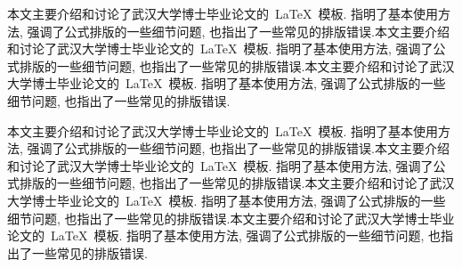\begin{cnabstract}
本文主要介绍和讨论了武汉大学博士毕业论文的~\LaTeX~模板.
指明了基本使用方法, 强调了公式排版的一些细节问题, 也指出了一些常见的排版错误.本文主要介绍和讨论了武汉大学博士毕业论文的~\LaTeX~模板.
指明了基本使用方法, 强调了公式排版的一些细节问题, 也指出了一些常见的排版错误.本文主要介绍和讨论了武汉大学博士毕业论文的~\LaTeX~模板.
指明了基本使用方法, 强调了公式排版的一些细节问题, 也指出了一些常见的排版错误.



本文主要介绍和讨论了武汉大学博士毕业论文的~\LaTeX~模板.
指明了基本使用方法, 强调了公式排版的一些细节问题, 也指出了一些常见的排版错误.本文主要介绍和讨论了武汉大学博士毕业论文的~\LaTeX~模板.
指明了基本使用方法, 强调了公式排版的一些细节问题, 也指出了一些常见的排版错误.本文主要介绍和讨论了武汉大学博士毕业论文的~\LaTeX~模板.
指明了基本使用方法, 强调了公式排版的一些细节问题, 也指出了一些常见的排版错误.本文主要介绍和讨论了武汉大学博士毕业论文的~\LaTeX~模板.
指明了基本使用方法, 强调了公式排版的一些细节问题, 也指出了一些常见的排版错误.






\end{cnabstract}
\vspace{1em}\par\vfill







